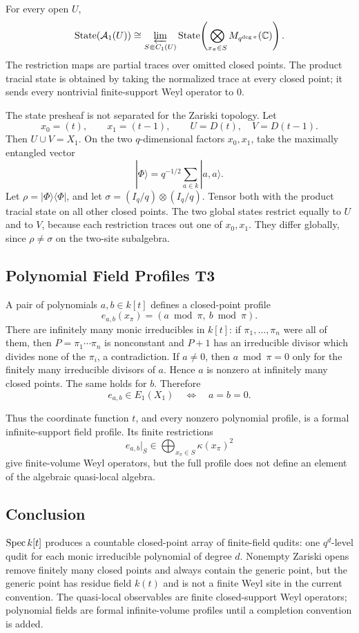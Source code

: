 For every open \(U\),
\[
  \operatorname{State}(\mathcal A_1(U))
  \cong
  \varprojlim_{S\Subset C_1(U)}
  \operatorname{State}\!\left(
  \bigotimes_{x_\pi\in S}M_{q^{\deg\pi}}(\mathbb C)\right).
\]
The restriction maps are partial traces over omitted closed points.  The
product tracial state is obtained by taking the normalized trace at every
closed point; it sends every nontrivial finite-support Weyl operator to \(0\).

The state presheaf is not separated for the Zariski topology.  Let
\[
  x_0=(t),\qquad x_1=(t-1),\qquad
  U=D(t),\quad V=D(t-1).
\]
Then \(U\cup V=X_1\).  On the two \(q\)-dimensional factors \(x_0,x_1\), take
the maximally entangled vector
\[
  |\Phi\rangle=q^{-1/2}\sum_{a\in k}|a,a\rangle.
\]
Let \(\rho=|\Phi\rangle\langle\Phi|\), and let
\(\sigma=(I_q/q)\otimes(I_q/q)\).  Tensor both with the product tracial state
on all other closed points.  The two global states restrict equally to \(U\)
and to \(V\), because each restriction traces out one of \(x_0,x_1\).  They
differ globally, since \(\rho\ne\sigma\) on the two-site subalgebra.

\subsection{Polynomial Field Profiles T3}

A pair of polynomials \(a,b\in k[t]\) defines a closed-point profile
\[
  e_{a,b}(x_\pi)=(a\bmod\pi,\ b\bmod\pi).
\]
There are infinitely many monic irreducibles in \(k[t]\): if
\(\pi_1,\ldots,\pi_n\) were all of them, then
\(P=\pi_1\cdots\pi_n\) is nonconstant and \(P+1\) has an irreducible divisor
which divides none of the \(\pi_i\), a contradiction.
If \(a\ne0\), then \(a\bmod\pi=0\) only for the finitely many irreducible
divisors of \(a\).  Hence \(a\) is nonzero at infinitely many closed points.
The same holds for \(b\).  Therefore
\[
  e_{a,b}\in E_1(X_1)
  \quad\Longleftrightarrow\quad
  a=b=0.
\]

Thus the coordinate function \(t\), and every nonzero polynomial profile, is a
formal infinite-support field profile.  Its finite restrictions
\[
  e_{a,b}|_S\in\bigoplus_{x_\pi\in S}\kappa(x_\pi)^2
\]
give finite-volume Weyl operators, but the full profile does not define an
element of the algebraic quasi-local algebra.

\subsection{Conclusion}

\(\operatorname{Spec} k[t]\) produces a countable closed-point array of finite-field qudits:
one \(q^d\)-level qudit for each monic irreducible polynomial of degree \(d\).
Nonempty Zariski opens remove finitely many closed points and always contain
the generic point, but the generic point has residue field \(k(t)\) and is not
a finite Weyl site in the current convention.  The quasi-local observables are
finite closed-support Weyl operators; polynomial fields are formal
infinite-volume profiles until a completion convention is added.
